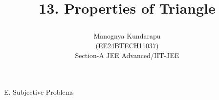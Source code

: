 \documentclass[journal,12pt,twocolumn]{IEEEtran}
\theoremstyle{remark}
\begin{document}
%






\title{
13. Properties of Triangle


}
\author{Manognya Kundarapu

(EE24BTECH11037)\\
\vspace{0.5cm}
Section-A JEE Advanced/IIT-JEE
}	





\maketitle

\newpage
\bigskip

\renewcommand{\thefigure}{\theenumi}
\renewcommand{\thetable}{\theenumi}



    
    




{E. Subjective Problems}
\end{document}
